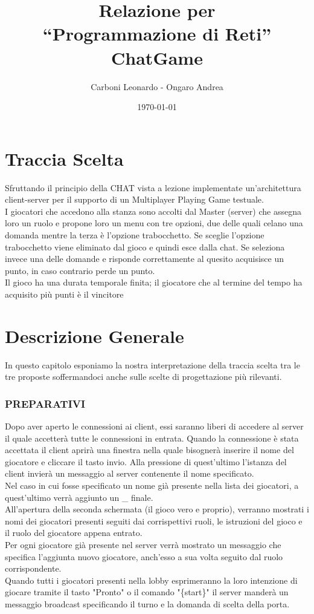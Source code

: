 \documentclass[a4paper,12pt]{report}
\title{Relazione per \\``Programmazione di Reti'' \\ ChatGame}
\author{Carboni Leonardo - Ongaro Andrea}
\date{\today}
\begin{document}
\maketitle

\tableofcontents
\thispagestyle{fancy}

\chapter{Traccia Scelta}
Sfruttando il principio della CHAT vista a lezione implementate
un’architettura client-server per il supporto di un Multiplayer
Playing Game testuale. \\
I giocatori che accedono alla stanza sono accolti dal Master
(server) che assegna loro un ruolo e propone loro un menu con
tre opzioni, due delle quali celano una domanda mentre la
terza è l’opzione trabocchetto. Se sceglie l’opzione trabocchetto viene eliminato dal gioco e quindi esce dalla chat.
Se seleziona invece una delle domande e risponde
correttamente al quesito acquisisce un punto, in caso contrario
perde un punto.\\
Il gioco ha una durata temporale finita; il giocatore che al
termine del tempo ha acquisito più punti è il vincitore

\chapter{Descrizione Generale}
In questo capitolo esponiamo la nostra interpretazione della traccia scelta tra le tre proposte soffermandoci anche sulle scelte di progettazione più rilevanti.

\subsection{PREPARATIVI}
Dopo aver aperto le connessioni ai client, essi saranno liberi di accedere al server il quale accetterà tutte le connessioni in entrata. Quando la connessione è stata accettata il client
aprirà una finestra nella quale bisognerà inserire il nome del giocatore e cliccare il tasto invio. Alla pressione di quest'ultimo l'istanza del client invierà un messaggio al server contenente il nome specificato.\\
Nel caso in cui fosse specificato un nome già presente nella lista dei giocatori, a quest'ultimo verrà aggiunto un \_ finale.\\
All'apertura della seconda schermata (il gioco vero e proprio), verranno mostrati i nomi dei giocatori presenti seguiti dai corrispettivi ruoli, le istruzioni del gioco e il ruolo del giocatore appena entrato.\\
Per ogni giocatore già presente nel server verrà mostrato un messaggio che specifica l'aggiunta nuovo giocatore, anch'esso a sua volta seguito dal ruolo corrispondente. \\
Quando tutti i giocatori presenti nella lobby esprimeranno la loro intenzione di giocare tramite il tasto "Pronto" o il comando "\{start\}"
il server manderà un messaggio broadcast specificando il turno e la domanda di scelta della porta.\clearpage
\end{document}
